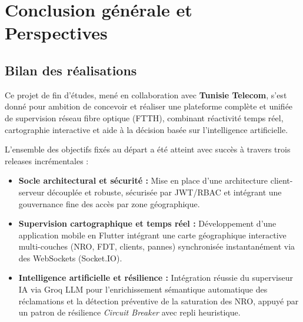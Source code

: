 \chapter*{Conclusion g\'en\'erale et Perspectives}

\section*{Bilan des r\'ealisations}
Ce projet de fin d'\'etudes, men\'e en collaboration avec \textbf{Tunisie Telecom}, s'est donn\'e pour ambition de concevoir et r\'ealiser une plateforme compl\`ete et unifi\'ee de supervision r\'eseau fibre optique (FTTH), combinant r\'eactivit\'e temps r\'eel, cartographie interactive et aide \`a la d\'ecision bas\'ee sur l'intelligence artificielle.

L'ensemble des objectifs fix\'es au d\'epart a \'et\'e atteint avec succ\`es \`a travers trois releases incr\'ementales :
\begin{itemize}
    \item \textbf{Socle architectural et s\'ecurit\'e :} Mise en place d'une architecture client-serveur d\'ecoupl\'ee et robuste, s\'ecuris\'ee par JWT/RBAC et int\'egrant une gouvernance fine des acc\`es par zone g\'eographique.
    \item \textbf{Supervision cartographique et temps r\'eel :} D\'eveloppement d'une application mobile en Flutter int\'egrant une carte g\'eographique interactive multi-couches (NRO, FDT, clients, pannes) synchronis\'ee instantan\'ement via des WebSockets (Socket.IO).
    \item \textbf{Intelligence artificielle et r\'esilience :} Int\'egration r\'eussie du superviseur IA via Groq LLM pour l'enrichissement s\'emantique automatique des r\'eclamations et la d\'etection pr\'eventive de la saturation des NRO, appuy\'e par un patron de r\'esilience \textit{Circuit Breaker} avec repli heuristique.
\end{itemize}

